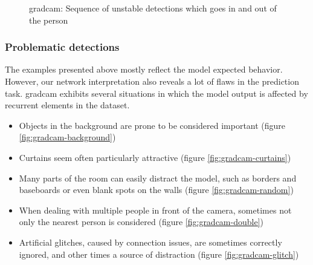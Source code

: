 \begin{figure}[!h]
\begin{center}
\begin{subfigure}[h]{0.24\textwidth}
		\end{subfigure}
	\end{center}
	\vspace{-0.5cm}
	\caption[\gls{gradcam}: Sequence of unstable detections which goes in and out of the person]{\gls{gradcam}: Sequence of unstable detections which goes in and out of the person}
	\label{fig:gradcam-seq-beard}
\end{figure}

\subsubsection*{Problematic detections}

The examples presented above mostly reflect the model expected behavior. However, our network interpretation also reveals a lot of flaws in the prediction task. \gls{gradcam} exhibits several situations in which the model output is affected by recurrent elements in the dataset.

\begin{itemize}
	\item Objects in the background are prone to be considered important (figure \ref{fig:gradcam-background})
	\item Curtains seem often particularly attractive (figure \ref{fig:gradcam-curtains})
	\item Many parts of the room can easily distract the model, such as borders and baseboards or even blank spots on the walls (figure \ref{fig:gradcam-random})
	\item When dealing with multiple people in front of the camera, sometimes not only the nearest person is considered (figure \ref{fig:gradcam-double})
	\item Artificial glitches, caused by connection issues, are sometimes correctly ignored, and other times a source of distraction (figure \ref{fig:gradcam-glitch})
\end{itemize}


